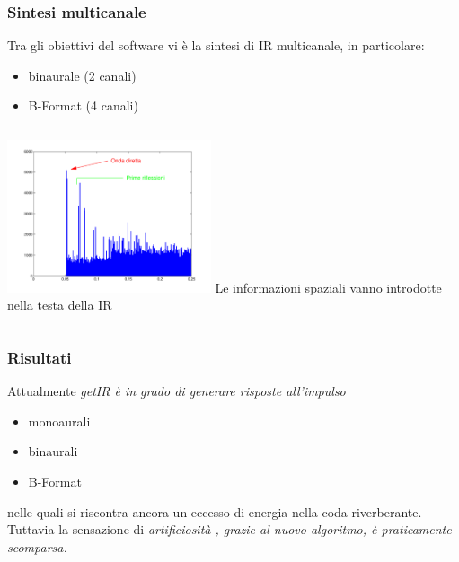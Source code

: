 \documentclass[10pt]{beamer}
\begin{document}
\begin{frame}
  \frametitle{Sintesi multicanale}

  Tra gli obiettivi del software vi \`e la sintesi di IR multicanale,
  in particolare:
  
  \begin{block}{}
    \begin{itemize}
      \item binaurale (2 canali)
      \item B-Format  (4 canali)
    \end{itemize}
  \end{block}
  \pause
  \begin{columns}
    \column{6cm}
    \includegraphics[width = 6cm]{graph/echodett_slides.pdf}
    \column{4cm}
    Le informazioni spaziali vanno introdotte nella testa della IR
  \end{columns}
\end{frame}




\begin{frame}
  \frametitle{Risultati}
  
  Attualmente \em getIR \em \`e in grado di generare risposte all'impulso  

  \begin{block}{}
    \begin{itemize}
      \item monoaurali 
      \item binaurali  
      \item B-Format
    \end{itemize}
  \end{block}
  
  nelle quali si riscontra ancora un eccesso di energia nella coda riverberante.\\
  \vskip 1cm
  \pause
  Tuttavia la sensazione di \em artificiosit\`a \em, grazie al nuovo
  algoritmo, \`e praticamente scomparsa.
\end{frame}
\end{document}
